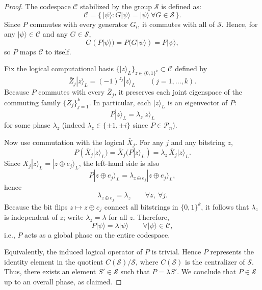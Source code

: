\documentclass[acmsmall,screen,review,anonymous,nonacm]{acmart}
\begin{document}
\begin{proof}
The codespace $\mathcal{C}$ stabilized by the group $\mathcal{S}$ is defined as:
\[
\mathcal{C} = \{\,|\psi\rangle : G|\psi\rangle = |\psi\rangle \ \forall G \in \mathcal{S}\,\}.
\]
Since $P$ commutes with every generator $G_i$, it commutes with all of $\mathcal{S}$. Hence, for any
$|\psi\rangle \in \mathcal{C}$ and any $G \in \mathcal{S}$,
\[
G(P|\psi\rangle) = P(G|\psi\rangle) = P|\psi\rangle,
\]
so $P$ maps $\mathcal{C}$ to itself.

Fix the logical computational basis $\{|z\rangle_L\}_{z\in\{0,1\}^k} \subset \mathcal{C}$
defined by
\[
\bar{Z}_j |z\rangle_L = (-1)^{z_j}|z\rangle_L \qquad (j=1,\dots,k).
\]
Because $P$ commutes with every $\bar{Z}_j$, it preserves each joint eigenspace of the
commuting family $\{\bar{Z}_j\}_{j=1}^k$. In particular, each $|z\rangle_L$ is an eigenvector of
$P$:
\[
P|z\rangle_L = \lambda_z |z\rangle_L
\]
for some phase $\lambda_z$ (indeed $\lambda_z \in \{\pm 1, \pm i\}$ since $P \in \mathcal{P}_n$).

Now use commutation with the logical $\bar{X}_j$. For any $j$ and any bitstring $z$,
\[
P(\bar{X}_j|z\rangle_L) = \bar{X}_j(P|z\rangle_L) = \lambda_z\,\bar{X}_j|z\rangle_L.
\]
Since $\bar{X}_j|z\rangle_L = |z\oplus e_j\rangle_L$, the left-hand side is also
\[
P|z\oplus e_j\rangle_L = \lambda_{z\oplus e_j}|z\oplus e_j\rangle_L,
\]
hence
\[
\lambda_{z\oplus e_j} = \lambda_z \qquad \forall z,\ \forall j.
\]
Because the bit flips $z \mapsto z\oplus e_j$ connect all bitstrings in $\{0,1\}^k$, it follows that
$\lambda_z$ is independent of $z$; write $\lambda_z=\lambda$ for all $z$. Therefore,
\[
P|\psi\rangle = \lambda |\psi\rangle \qquad \forall |\psi\rangle \in \mathcal{C},
\]
i.e., $P$ acts as a global phase on the entire codespace.

Equivalently, the induced logical operator of $P$ is trivial. Hence $P$ represents the
identity element in the quotient $C(\mathcal{S})/\mathcal{S}$, where $C(\mathcal{S})$ is the centralizer of $\mathcal{S}$. Thus, there exists an element $S' \in \mathcal{S}$ such that
$P = \lambda S'$. We conclude that $P \in \mathcal{S}$ up to an overall phase, as claimed.
\end{proof}
\end{document}
